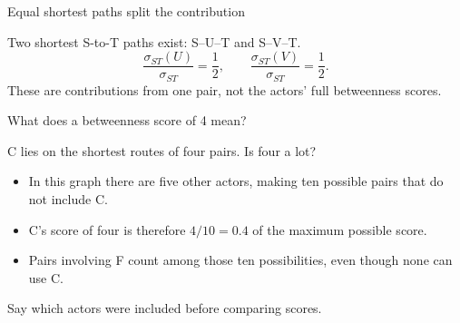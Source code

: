 \documentclass[aspectratio=169,11pt]{beamer}
\begin{document}
\begin{frame}{Equal shortest paths split the contribution}

\begin{center}
\end{center}
Two shortest S-to-T paths exist: S--U--T and S--V--T.
\[\frac{\sigma_{ST}(U)}{\sigma_{ST}}=\frac12,\qquad
\frac{\sigma_{ST}(V)}{\sigma_{ST}}=\frac12.\]
These are contributions from one pair, not the actors' full betweenness scores.


\end{frame}

\begin{frame}{What does a betweenness score of 4 mean?}

C lies on the shortest routes of four pairs. Is four a lot?
\begin{itemize}
\item In this graph there are five other actors, making ten possible pairs that do not include C.
\medskip\item C's score of four is therefore $4/10=0.4$ of the maximum possible score.
\medskip\item Pairs involving F count among those ten possibilities, even though none can use C.
\end{itemize}
\textcolor{accent}{Say which actors were included before comparing scores.}

\end{frame}
\end{document}
